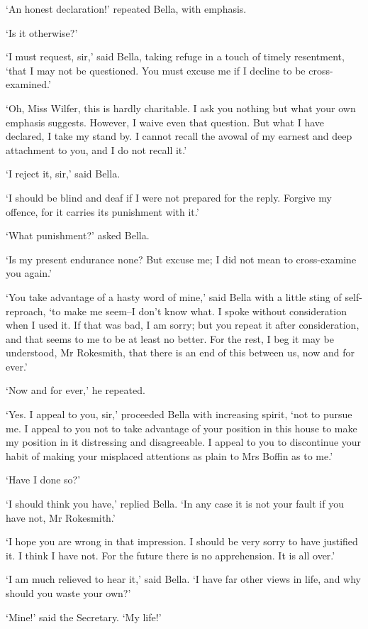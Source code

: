‘An honest declaration!’ repeated Bella, with emphasis.

‘Is it otherwise?’

‘I must request, sir,’ said Bella, taking refuge in a touch of timely
resentment, ‘that I may not be questioned. You must excuse me if I
decline to be cross-examined.’

‘Oh, Miss Wilfer, this is hardly charitable. I ask you nothing but what
your own emphasis suggests. However, I waive even that question. But
what I have declared, I take my stand by. I cannot recall the avowal of
my earnest and deep attachment to you, and I do not recall it.’

‘I reject it, sir,’ said Bella.

‘I should be blind and deaf if I were not prepared for the reply.
Forgive my offence, for it carries its punishment with it.’

‘What punishment?’ asked Bella.

‘Is my present endurance none? But excuse me; I did not mean to
cross-examine you again.’

‘You take advantage of a hasty word of mine,’ said Bella with a little
sting of self-reproach, ‘to make me seem--I don’t know what. I spoke
without consideration when I used it. If that was bad, I am sorry; but
you repeat it after consideration, and that seems to me to be at least
no better. For the rest, I beg it may be understood, Mr Rokesmith, that
there is an end of this between us, now and for ever.’

‘Now and for ever,’ he repeated.

‘Yes. I appeal to you, sir,’ proceeded Bella with increasing spirit,
‘not to pursue me. I appeal to you not to take advantage of your
position in this house to make my position in it distressing and
disagreeable. I appeal to you to discontinue your habit of making your
misplaced attentions as plain to Mrs Boffin as to me.’

‘Have I done so?’

‘I should think you have,’ replied Bella. ‘In any case it is not your
fault if you have not, Mr Rokesmith.’

‘I hope you are wrong in that impression. I should be very sorry to
have justified it. I think I have not. For the future there is no
apprehension. It is all over.’

‘I am much relieved to hear it,’ said Bella. ‘I have far other views in
life, and why should you waste your own?’

‘Mine!’ said the Secretary. ‘My life!’

